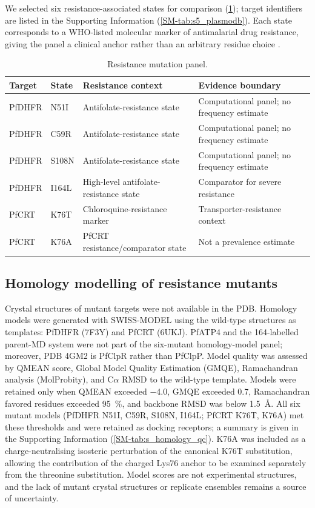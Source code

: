 \documentclass[journal=jcisd8,manuscript=article,layout=traditional]{achemso}
\begin{document}
We selected six resistance-associated states for comparison (\cref{tab:mutations}); target identifiers are listed in the Supporting Information (\cref{SM-tab:s5_plasmodb}). Each state corresponds to a WHO-listed molecular marker of antimalarial drug resistance, giving the panel a clinical anchor rather than an arbitrary residue choice \citep{who_compendium_markers}.

\begin{table}[htbp]
\centering
\caption{Resistance mutation panel.}
\label{tab:mutations}
\begin{tabularx}{\textwidth}{l l l X}
\toprule
Target & State & Resistance context & Evidence boundary \\
\midrule
PfDHFR & N51I & Antifolate-resistance state & Computational panel; no frequency estimate \\
PfDHFR & C59R & Antifolate-resistance state & Computational panel; no frequency estimate \\
PfDHFR & S108N & Antifolate-resistance state & Computational panel; no frequency estimate \\
PfDHFR & I164L & High-level antifolate-resistance state & Comparator for severe resistance \\
PfCRT & K76T & Chloroquine-resistance marker & Transporter-resistance context \\
PfCRT & K76A & PfCRT resistance/comparator state & Not a prevalence estimate \\
\bottomrule
\end{tabularx}
\end{table}

\subsection{Homology modelling of resistance mutants}

Crystal structures of mutant targets were not available in the PDB. Homology models were generated with SWISS-MODEL using the wild-type structures as templates: PfDHFR (7F3Y) and PfCRT (6UKJ). PfATP4 and the 164-labelled parent-MD system were not part of the six-mutant homology-model panel; moreover, PDB 4GM2 is PfClpR rather than PfClpP. Model quality was assessed by QMEAN score, Global Model Quality Estimation (GMQE), Ramachandran analysis (MolProbity), and C$\alpha$ RMSD to the wild-type template. Models were retained only when QMEAN exceeded \num{-4.0}, GMQE exceeded \num{0.7}, Ramachandran favored residues exceeded \qty{95}{\percent}, and backbone RMSD was below \qty{1.5}{\angstrom}. All six mutant models (PfDHFR N51I, C59R, S108N, I164L; PfCRT K76T, K76A) met these thresholds and were retained as docking receptors; a summary is given in the Supporting Information (\cref{SM-tab:s_homology_qc}). K76A was included as a charge-neutralising isosteric perturbation of the canonical K76T substitution, allowing the contribution of the charged Lys76 anchor to be examined separately from the threonine substitution. Model scores are not experimental structures, and the lack of mutant crystal structures or replicate ensembles remains a source of uncertainty.
\end{document}
